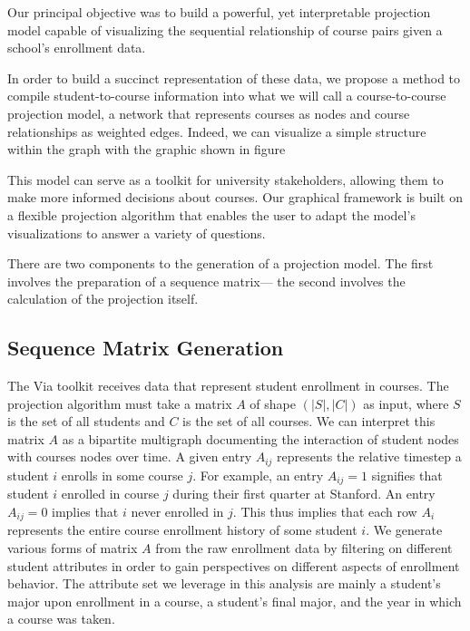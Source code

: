 \documentclass{sigchi}
\begin{document}
Our principal objective was to build a powerful, yet interpretable projection model capable of visualizing the sequential relationship of course pairs given a school's enrollment data.

In order to build a succinct representation of these data, we propose a method to compile student-to-course information into what we will call a course-to-course projection model, a network that represents courses as nodes and course relationships as weighted edges. Indeed, we can visualize a simple structure within the graph with the graphic shown in figure 

This model can serve as a toolkit for university stakeholders, allowing them to make more informed decisions about courses. Our graphical framework is built on a flexible projection algorithm that enables the user to adapt the model's visualizations to answer a variety of questions. 

There are two components to the generation of a projection model. The first involves the preparation of a sequence matrix--- the second involves the calculation of the projection itself.

\subsection{Sequence Matrix Generation}
\label{sec:seq_martix}

The Via toolkit receives data that represent student enrollment in courses. The projection algorithm must take a matrix $A$ of shape $(|S|, |C|)$ as input, where $S$ is the set of all students and $C$ is the set of all courses. We can interpret this matrix $A$ as a bipartite multigraph documenting the interaction of student nodes with courses nodes over time. A given entry $A_{ij}$ represents the relative timestep a student $i$ enrolls in some course $j$. For example, an entry $A_{ij} = 1$ signifies that student $i$ enrolled in course $j$ during their first quarter at Stanford. An entry $A_{ij} = 0$ implies that $i$ never enrolled in $j$. This thus implies that each row $A_i$ represents the entire course enrollment history of some student $i$. We generate various forms of matrix $A$ from the raw enrollment data by filtering on different student attributes in order to gain perspectives on different aspects of enrollment behavior. The attribute set we leverage in this analysis are mainly a student's major upon enrollment in a course, a student's final major, and the year in which a course was taken. 
\end{document}
